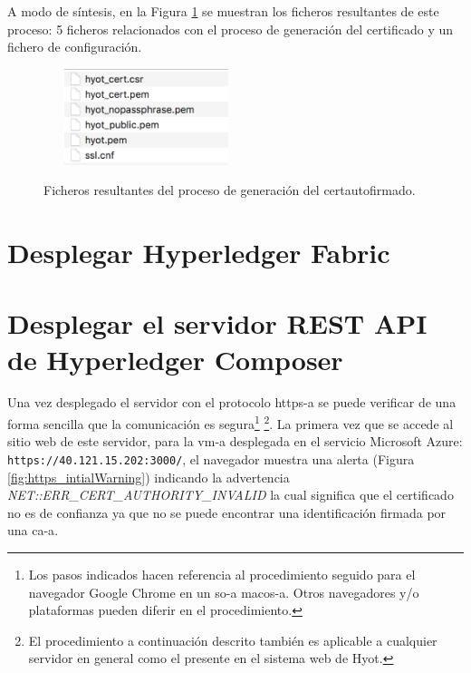 \documentclass[12pt,a4paper, twoside]{report}
\begin{document}
	A modo de síntesis, en la Figura \ref{fig:cert_files} se muestran los ficheros resultantes de este proceso: 5 ficheros relacionados con el proceso de generación del certificado y un fichero de configuración.
			
		\begin{figure}[!ht]   
			\caption{Ficheros resultantes del proceso de generación del \gls{certautofirmado}.} 
			\begin{center} 
	 			\includegraphics[width=6cm,height=2.8cm]{Images/installationManual/cert/cert_files.png} \\
				\label{fig:cert_files} 
			\end{center}  
		\end{figure}
		
	\section{Desplegar Hyperledger Fabric}	
	
	\section{Desplegar el servidor REST API de Hyperledger Composer}	
						
	Una vez desplegado el servidor con el protocolo \gls{https-a} se puede verificar de una forma sencilla que la comunicación es segura\footnote{Los pasos indicados hacen referencia al procedimiento seguido para el navegador Google Chrome en un \gls{so-a} \gls{macos-a}. Otros navegadores y/o plataformas pueden diferir en el procedimiento.} \footnote{El procedimiento a continuación descrito también es aplicable a cualquier servidor en general como el presente en el sistema web de Hyot.}. La primera vez que se accede al sitio web de este servidor, para la \gls{vm-a} desplegada en el servicio Microsoft Azure: \texttt{https://40.121.15.202:3000/}, el navegador muestra una alerta (Figura \ref{fig:https_intialWarning}) indicando la advertencia \textit{NET::ERR\_CERT\_AUTHORITY\_INVALID} la cual significa que el certificado no es de confianza ya que no se puede encontrar una identificación firmada por una \gls{ca-a}.
				
\end{document}
